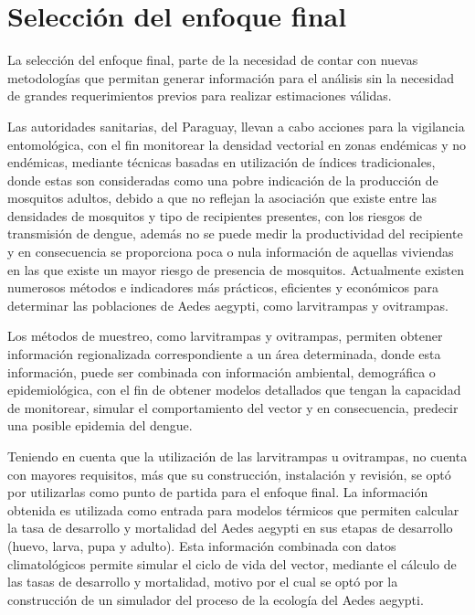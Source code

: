 \section{Selección del enfoque final}
La selección del enfoque final, parte de la necesidad de contar con nuevas metodologías que
permitan generar información para el análisis sin la necesidad de grandes requerimientos previos
para realizar estimaciones válidas.

Las autoridades sanitarias, del Paraguay, llevan a cabo acciones para la vigilancia entomológica,
con el fin monitorear la densidad vectorial en zonas endémicas y no endémicas, mediante técnicas
basadas en utilización de índices tradicionales, donde estas son consideradas como una pobre
indicación de la producción de mosquitos adultos, debido a que no reflejan la asociación que
existe entre las densidades de mosquitos y tipo de recipientes presentes, con los riesgos de
transmisión de dengue, además no se puede medir la productividad del recipiente y en consecuencia
se proporciona poca o nula información de aquellas viviendas en las que existe un mayor riesgo de
presencia de mosquitos. Actualmente existen numerosos métodos e indicadores más prácticos,
eficientes y económicos para determinar las poblaciones de Aedes aegypti, como larvitrampas y
ovitrampas.

Los métodos de muestreo, como larvitrampas y ovitrampas, permiten obtener información regionalizada
correspondiente a un área determinada, donde esta información, puede ser combinada con información
ambiental, demográfica o epidemiológica, con el fin de obtener modelos detallados que tengan la
capacidad de monitorear, simular el comportamiento del vector y en consecuencia, predecir una
posible epidemia del dengue.

Teniendo en cuenta que la utilización de las larvitrampas u ovitrampas, no cuenta con mayores
requisitos, más que su construcción, instalación y revisión, se optó por utilizarlas como punto
de partida para el enfoque final. La información obtenida es utilizada como entrada para
modelos térmicos que permiten calcular la tasa de desarrollo y mortalidad del Aedes aegypti en sus
etapas de desarrollo (huevo, larva, pupa y adulto). Esta información combinada con datos
climatológicos permite simular el ciclo de vida del vector, mediante el cálculo de las tasas de
desarrollo y mortalidad, motivo por el cual se optó por la construcción de un simulador del
proceso de la ecología del Aedes aegypti.
